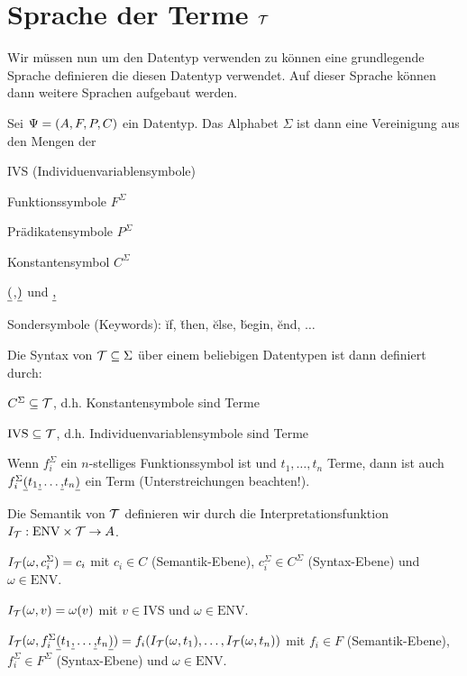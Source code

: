 \section{Sprache der Terme $\mathcal{T}$}
Wir müssen nun um den Datentyp verwenden zu können eine grundlegende Sprache 
definieren die diesen Datentyp verwendet. Auf dieser Sprache können dann weitere Sprachen
aufgebaut werden.
\begin{defn}\label{defn:semt}
Sei $\Psi=\left(A,F,P,C\right)$ ein Datentyp.
Das Alphabet $\Sigma$ ist dann eine Vereinigung aus den Mengen der
\begin{\whichitem}
\item IVS (Individuenvariablensymbole)
\item Funktionssymbole $F^{\Sigma}$
\item Prädikatensymbole $P^{\Sigma}$
\item Konstantensymbol $C^{\Sigma}$
\item $\underline{(}$,$\underline{)}$ und $\underline{,}$
\item Sondersymbole (Keywords): \u{if}, \u{then}, \u{else}, \u{begin}, \u{end}, $\ldots$
\end{\whichitem}
Die Syntax von $\mathcal{T} \subseteq \Sigma$ über einem beliebigen Datentypen ist dann definiert durch:
\begin{\whichenum}
\item $C^{\Sigma} \subseteq \mathcal{T}$, d.h. Konstantensymbole sind Terme
\item $\text{IVS} \subseteq \mathcal{T}$, d.h. Individuenvariablensymbole sind Terme
\item Wenn $f^{\Sigma}_i$ ein $n$-stelliges Funktionssymbol ist und $t_1,\ldots,t_n$ Terme,
dann ist auch $f^{\Sigma}_i\underline{(}t_1\underline{,}\ldots\underline{,}t_n\underline{)}$ ein Term (Unterstreichungen beachten!).
\end{\whichenum}
Die Semantik von $\mathcal{T}$ definieren wir durch die Interpretationsfunktion $I_{\mathcal{T}}: \text{ENV} \times \mathcal{T} \to A$.
\begin{\whichenum}
\item $I_{\mathcal{T}}(\omega,c^{\Sigma}_i)=c_i$ mit $c_i \in C$ (Semantik-Ebene), $c^{\Sigma}_i \in C^{\Sigma}$ (Syntax-Ebene) und $\omega \in \text{ENV}$.
\item $I_{\mathcal{T}}(\omega,v)=\omega(v)$ mit $v \in \text{IVS}$ und $\omega \in \text{ENV}$.
\item $I_{\mathcal{T}}(\omega,f^{\Sigma}_i\underline{(}t_1\underline{,}\ldots\underline{,}t_n\underline{)})=f_i(I_{\mathcal{T}}(\omega,t_1),\ldots,I_{\mathcal{T}}(\omega,t_n))$ mit $f_i \in F$ (Semantik-Ebene), $f^{\Sigma}_i \in F^{\Sigma}$ (Syntax-Ebene) und $\omega \in \text{ENV}$.
\end{\whichenum}
\end{defn}


